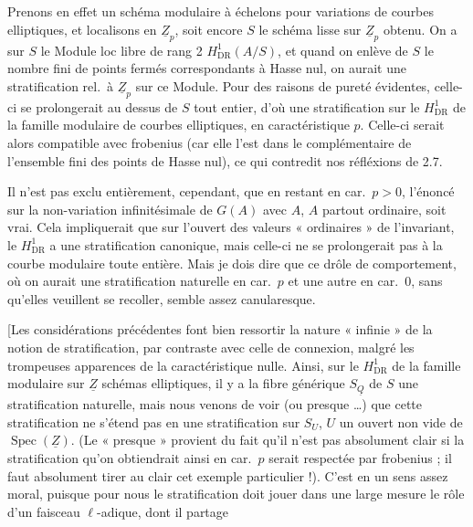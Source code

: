 \documentclass[11pt,a4paper]{article}
\begin{document}
Prenons en effet un schéma  modulaire à échelons  pour
variations de courbes elliptiques, et localisons en $\underline{Z}_p$, soit
encore $S$ le schéma lisse sur $\underline{Z}_p$ obtenu. On a sur $S$ le Module
loc libre de rang 2 $H^1_{\mathrm{DR}}(A/S)$, et quand on enlève de $S$ le
nombre fini de points fermés correspondants à Hasse nul, on aurait une
stratification \struck{\ill{}} rel.\ à $\underline{Z}_p$ sur ce Module. Pour
des raisons de pureté évidentes, celle-ci se prolongerait au dessus de $S$
tout entier, d'où une stratification sur le $H^1_{\mathrm{DR}}$ de la famille
modulaire de courbes elliptiques, en caractéristique $p$. Celle-ci serait alors
compatible avec frobenius (car elle l'est dans le complémentaire de l'ensemble
fini des points de Hasse nul), ce qui contredit nos réfléxions de 2.7.

Il n'est pas exclu entièrement, cependant, que en restant en car.\ $p>0$,
l'énoncé sur la non-variation \struck{\ill{}} infinitésimale de $G(A)$ avec
$A$, $A$ partout ordinaire, soit vrai. Cela impliquerait que sur l'ouvert des
valeurs « ordinaires » de l'invariant, le $H^1_{\mathrm{DR}}$ a une
stratification canonique, mais celle-ci ne se prolongerait pas à la courbe
modulaire toute entière. Mais je dois dire que ce drôle de comportement, où on
aurait une stratification naturelle en car.\ $p$ et une autre en car.~0, sans
qu'elles veuillent se recoller, semble assez canularesque.

[Les considérations précédentes font bien ressortir la nature « infinie » de
la notion de stratification, par contraste avec celle de connexion, malgré les
trompeuses apparences de la caractéristique nulle. Ainsi, sur le
$H^1_{\mathrm{DR}}$ de la famille modulaire sur $\underline{Z}$ 
 schémas elliptiques, il y a   la fibre
générique $S_{\underline{Q}}$ de $S$ une stratification naturelle, mais nous
venons de voir (ou presque \ldots) que cette stratification ne s'étend pas en
une stratification sur $S_U$, $U$ un ouvert non vide de
$\operatorname{Spec}(\underline{Z})$. (Le « presque » provient du fait qu'il
n'est pas absolument clair si la stratification qu'on obtiendrait ainsi en
car.\ $p$ serait respectée par frobenius ; il faut absolument tirer au clair
cet exemple particulier !). C'est en un sens assez moral, puisque pour nous le
 stratification doit jouer dans une large mesure le rôle d'un
faisceau $\ell$-adique, dont il partage
\end{document}
